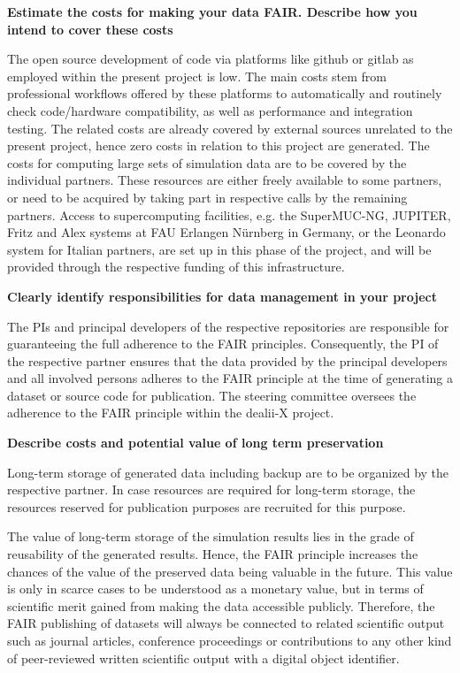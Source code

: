 \documentclass[a4paper,12pt]{article}
\begin{document}
\noindent \textbf{Estimate the costs for making your data FAIR. Describe how you intend to cover these costs}

The open source development of code via platforms like github or gitlab as employed within the present project is low. The main costs stem from professional workflows offered by these platforms to automatically and routinely check code/hardware compatibility, as well as performance and integration testing. The related costs are already covered by external sources unrelated to the present project, hence zero costs in relation to this project are generated. The costs for computing large sets of simulation data are to be covered by the individual partners. These resources are either freely available to some partners, or need to be acquired by taking part in respective calls by the remaining partners. Access to supercomputing facilities, e.g. the SuperMUC-NG, JUPITER, Fritz and Alex systems at FAU Erlangen Nürnberg in Germany, or the Leonardo system for Italian partners, are set up in this phase of the project, and will be provided through the respective funding of this infrastructure.

\noindent \textbf{Clearly identify responsibilities for data management in your project}

The PIs and principal developers of the respective repositories are responsible for guaranteeing the full adherence to the FAIR principles. Consequently, the PI of the respective partner ensures that the data provided by the principal developers and all involved persons adheres to the FAIR principle at the time of generating a dataset or source code for publication. The steering committee oversees the adherence to the FAIR principle within the dealii-X project.

\noindent \textbf{Describe costs and potential value of long term preservation}

Long-term storage of generated data including backup are to be organized by the respective partner. In case resources are required for long-term storage, the resources reserved for publication purposes are recruited for this purpose.

The value of long-term storage of the simulation results lies in the grade of reusability of the generated results. Hence, the FAIR principle increases the chances of the value of the preserved data being valuable in the future. This value is only in scarce cases to be understood as a monetary value, but in terms of scientific merit gained from making the data accessible publicly. Therefore, the FAIR publishing of datasets will always be connected to related scientific output such as journal articles, conference proceedings or contributions to any other kind of peer-reviewed written scientific output with a digital object identifier.  
\end{document}
